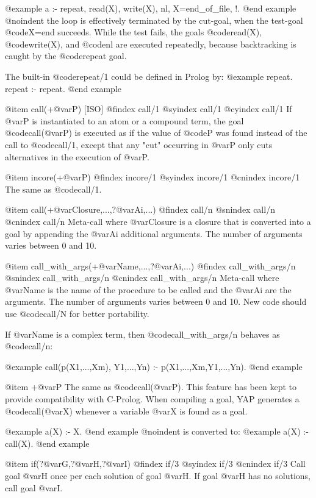 {{{{@example
 a :- repeat, read(X), write(X), nl, X=end_of_file, !.
@end example
@noindent
the loop is effectively terminated by the cut-goal, when the test-goal
@code{X=end} succeeds. While the test fails, the goals @code{read(X)},
@code{write(X)}, and @code{nl} are executed repeatedly, because
backtracking is caught by the @code{repeat} goal.

The built-in @code{repeat/1} could be defined in Prolog by:
@example
 repeat.
 repeat :- repeat.
@end example

@item call(+@var{P}) [ISO]
@findex call/1
@syindex call/1
@cyindex call/1
 If @var{P} is instantiated to an atom or a compound term, the goal
@code{call(@var{P})} is executed as if the value of @code{P} was found
instead of the call to @code{call/1}, except that any "cut" occurring in
@var{P} only cuts alternatives in the execution of @var{P}.

@item incore(+@var{P})
@findex incore/1
@syindex incore/1
@cnindex incore/1
The same as @code{call/1}.

@item call(+@var{Closure},...,?@var{Ai},...)
@findex call/n
@snindex call/n
@cnindex call/n
Meta-call where @var{Closure} is a closure that is converted into a goal by 
appending the @var{Ai} additional arguments. The number of arguments varies 
between 0 and 10.

@item call_with_args(+@var{Name},...,?@var{Ai},...)
@findex call_with_args/n
@snindex call_with_args/n
@cnindex call_with_args/n
Meta-call where @var{Name} is the name of the procedure to be called and
the @var{Ai} are the arguments. The number of arguments varies between 0
and 10. New code should use @code{call/N} for better portability.

If @var{Name} is a complex term, then @code{call_with_args/n} behaves as
@code{call/n}:

@example
call(p(X1,...,Xm), Y1,...,Yn) :- p(X1,...,Xm,Y1,...,Yn).
@end example


@item +@var{P}
 The same as @code{call(@var{P})}. This feature has been kept to provide
compatibility with C-Prolog. When compiling a goal, YAP
generates a @code{call(@var{X})} whenever a variable @var{X} is found as
a goal.

@example
 a(X) :- X.
@end example
@noindent
is converted to:
@example
 a(X) :- call(X).
@end example

@item if(?@var{G},?@var{H},?@var{I})
@findex if/3
@syindex if/3
@cnindex if/3
Call goal @var{H} once per each solution of goal @var{H}. If goal
@var{H} has no solutions, call goal @var{I}.

}}}}
